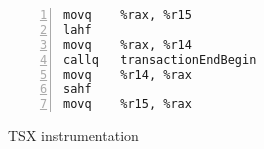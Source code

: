 \begin{figure}
\begin{center}




\begin{minipage}{0.3\textwidth}
\begin{lstlisting}[basicstyle=\scriptsize,numbers=left]
movq	%rax, %r15
lahf
movq	%rax, %r14
callq	transactionEndBegin
movq	%r14, %rax
sahf
movq	%r15, %rax
\end{lstlisting}
\end{minipage}

\end{center}
\caption{TSX instrumentation}\label{fg-tsgx}
\end{figure}